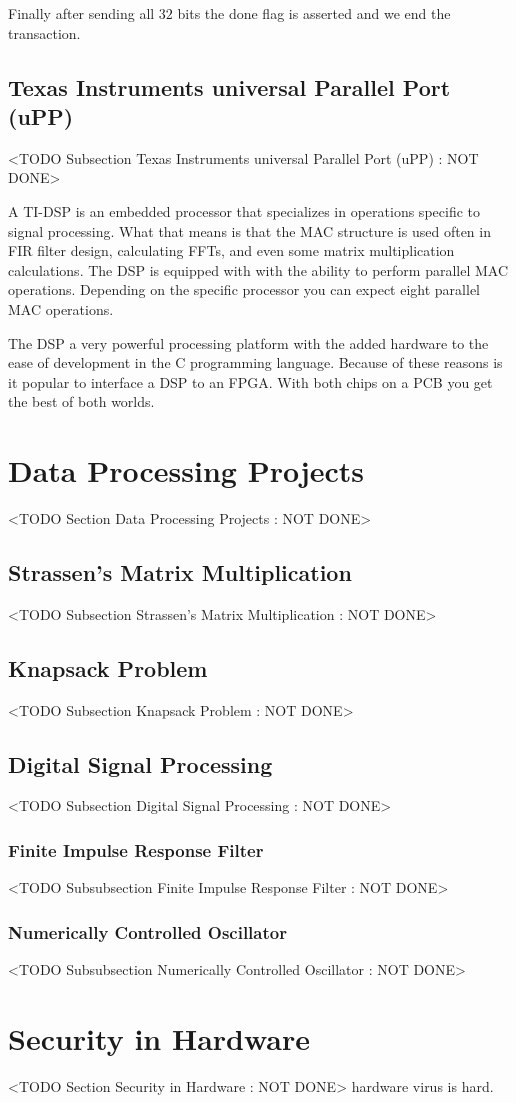 Finally after sending all $32$ bits the done flag is asserted and we end the transaction. 
	
	
\subsection{Texas Instruments universal Parallel Port (uPP)}
	<TODO Subsection Texas Instruments universal Parallel Port (uPP) : NOT DONE>
	
A \ac{TI}-\ac{DSP} is an embedded processor that specializes in operations specific to signal processing. What that means is that the \ac{MAC} structure is used often in \ac{FIR} filter design, calculating \ac{FFT}s, and even some matrix multiplication calculations. The \ac{DSP} is equipped with with the ability to perform parallel \ac{MAC} operations. Depending on the specific processor you can expect eight parallel \ac{MAC} operations. 

The \ac{DSP} a very powerful processing platform with the added hardware to the ease of development in the C programming language. Because of these reasons is it popular to interface a \ac{DSP} to an \ac{FPGA}. With both chips on a \ac{PCB} you get the best of both worlds. 

\section{Data Processing Projects}
	<TODO Section Data Processing Projects : NOT DONE>

\subsection{Strassen's Matrix Multiplication}
	<TODO Subsection Strassen's Matrix Multiplication : NOT DONE>

\subsection{Knapsack Problem}
	<TODO Subsection Knapsack Problem : NOT DONE>

\subsection{Digital Signal Processing}
	<TODO Subsection Digital Signal Processing : NOT DONE>

\subsubsection{Finite Impulse Response Filter}
	<TODO Subsubsection  Finite Impulse Response Filter : NOT DONE>

\subsubsection{Numerically Controlled Oscillator}
	<TODO Subsubsection  Numerically Controlled Oscillator : NOT DONE>

\section{Security in Hardware}
	<TODO Section Security in Hardware : NOT DONE>
hardware virus is hard. 
